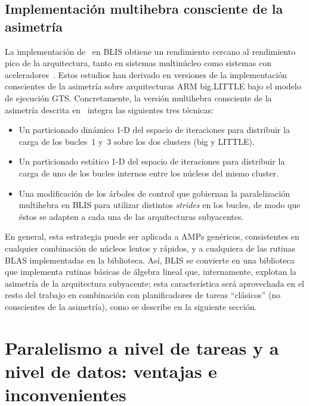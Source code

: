 

\subsection{Implementación multihebra consciente de la asimetría}

La implementación de \gemm\ en BLIS obtiene un rendimiento cercano al
rendimiento pico de la arquitectura, tanto en sistemas multinúcleo como
sistemas con aceleradores~\cite{BLIS2,BLIS3}.  Estos estudios han derivado en
versiones de la implementación conscientes de la asimetría sobre
arquitecturas ARM big.LITTLE bajo el modelo de ejecución
GTS. Concretamente, la versión multihebra consciente de la asimetría descrita
en~\cite{asymBLIS} integra las siguientes tres técnicas:
\begin{itemize}
\item Un particionado dinámico 1-D del espacio de iteraciones para distribuir la carga de los bucles~1 y~3 sobre los dos
	clusters (big y LITTLE).
\item Un particionado estático 1-D del espacio de iteraciones para distribuir la carga de uno de los  bucles internos entre los núcleos
	del mismo cluster.
\item Una modificación de los árboles de control que gobiernan la paralelización multihebra en BLIS para utilizar distintos {\em strides} en 
	los bucles, de modo que éstos se adapten a cada una de las arquitecturas subyacentes.
\end{itemize}

En general, esta estrategia puede ser aplicada a AMPs genéricos, consistentes en cualquier combinación de núcleos lentos y rápidos, y a cualquiera
de las rutinas BLAS implementadas en la biblioteca. Así, BLIS se convierte en una biblioteca que implementa rutinas básicas de álgebra lineal que,
internamente, explotan la asimetría de la arquitectura subyacente; esta característica será aprovechada en el resto del trabajo en combinación
con planificadores de tareas ``clásicos'' (no conscientes de la asimetría), como se describe en la siguiente sección.


\section{Paralelismo a nivel de tareas y a nivel de datos: ventajas e inconvenientes}
\label{sec:comparativa}

